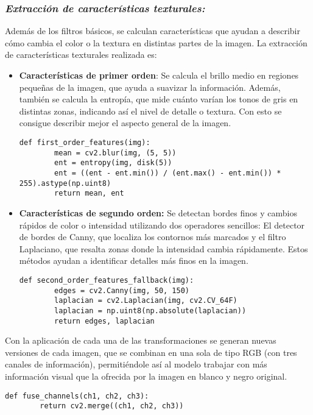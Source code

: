 \documentclass[12pt]{article}
\begin{document}
\subsubsection{\textit{Extracción de características texturales:}}
Además de los filtros básicos, se calculan características que ayudan a describir cómo cambia el color o la textura en distintas partes de la imagen. La extracción de características texturales realizada es:
\begin{itemize}
    \item \textbf{Características de primer orden}: Se calcula el brillo medio en regiones pequeñas de la imagen, que ayuda a suavizar la información. Además, también se calcula la entropía, que mide cuánto varían los tonos de gris en distintas zonas, indicando así el nivel de detalle o textura.  Con esto se consigue describir mejor el aspecto general de la imagen.
    \begin{lstlisting}[caption={Características de primer orden}, label=lst:firstorder]
    def first_order_features(img):
        mean = cv2.blur(img, (5, 5))
        ent = entropy(img, disk(5))
        ent = ((ent - ent.min()) / (ent.max() - ent.min()) * 255).astype(np.uint8)
        return mean, ent
    \end{lstlisting}

    \item \textbf{Características de segundo orden:}  Se detectan bordes finos y cambios rápidos de color o intensidad utilizando dos operadores sencillos: El detector de bordes de Canny, que localiza los contornos más marcados y el filtro Laplaciano, que resalta zonas donde la intensidad cambia rápidamente. Estos métodos ayudan a identificar detalles más finos en la imagen.
    \begin{lstlisting}[caption={Características de segundo orden}, label=lst:secondorder]
    def second_order_features_fallback(img):
        edges = cv2.Canny(img, 50, 150)
        laplacian = cv2.Laplacian(img, cv2.CV_64F)
        laplacian = np.uint8(np.absolute(laplacian))
        return edges, laplacian
    \end{lstlisting}
\end{itemize}
Con la aplicación de cada una de las transformaciones se generan nuevas versiones de cada imagen, que se combinan en una sola de tipo RGB (con tres canales de información), permitiéndole así al modelo trabajar con más información visual que la ofrecida por la imagen en blanco y negro original. 
\begin{lstlisting}[caption={Fusión de canales en RGB}, label=lst:fusion]
    def fuse_channels(ch1, ch2, ch3):
        return cv2.merge((ch1, ch2, ch3))
\end{lstlisting}
\end{document}

